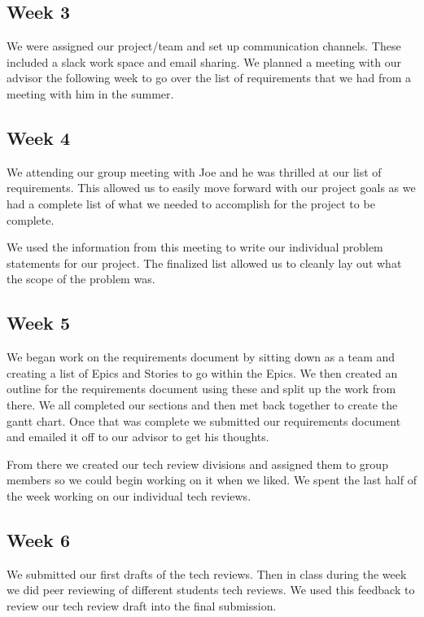 \documentclass[draftclsnofoot,onecolumn,journal,letterpaper,compsoc,10pt]{IEEEtran}
\begin{document}
    \subsection{Week 3}
    We were assigned our project/team and set up communication channels.  These included a slack work space and email sharing.  We planned a meeting with our advisor the following week to go over the list of requirements that we had from a meeting with him in the summer.
    
    \subsection{Week 4}
    We attending our group meeting with Joe and he was thrilled at our list of requirements.  This allowed us to easily move forward with our project goals as we had a complete list of what we needed to accomplish for the project to be complete.
    
    We used the information from this meeting to write our individual problem statements for our project.  The finalized list allowed us to cleanly lay out what the scope of the problem was.
    
    
    \subsection{Week 5}
    We began work on the requirements document by sitting down as a team and creating a list of Epics and Stories to go within the Epics.  We then created an outline for the requirements document using these and split up the work from there.  We all completed our sections and then met back together to create the gantt chart.  Once that was complete we submitted our requirements document and emailed it off to our advisor to get his thoughts.
    
    From there we created our tech review divisions and assigned them to group members so we could begin working on it when we liked.  We spent the last half of the week working on our individual tech reviews.
    
    
    \subsection{Week 6}
    We submitted our first drafts of the tech reviews.  Then in class during the week we did peer reviewing of different students tech reviews.  We used this feedback to review our tech review draft into the final submission.
    
\end{document}
